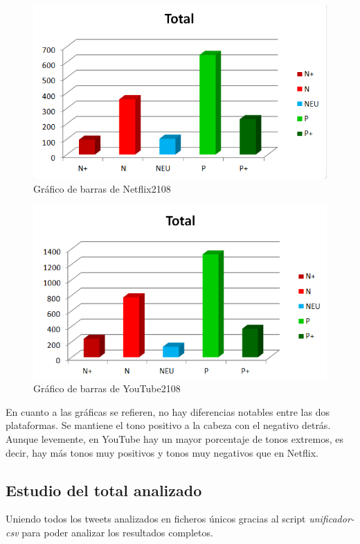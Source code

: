\begin{figure}[H]
	\centering
	\includegraphics[scale=.3]{imagenes/barrasNetflix2108.PNG}
	\caption{Gráfico de barras de Netflix2108}
	\label{fig:barrasNetflix2108}
\end{figure}



\begin{figure}[H]
	\centering
	\includegraphics[scale=.3]{imagenes/barrasYT2108.PNG}
	\caption{Gráfico de barras de YouTube2108}
	\label{fig:barrasYT2108}
\end{figure}


En cuanto a las gráficas se refieren, no hay diferencias notables entre las dos plataformas. Se mantiene el tono positivo a la cabeza con el negativo detrás. Aunque levemente, en YouTube hay un mayor porcentaje de tonos extremos, es decir, hay más tonos muy positivos y tonos muy negativos que en Netflix. 



\subsection{Estudio del total analizado}
Uniendo todos los tweets analizados en ficheros únicos gracias al script \textit{unificador-csv} para poder analizar los resultados completos.


